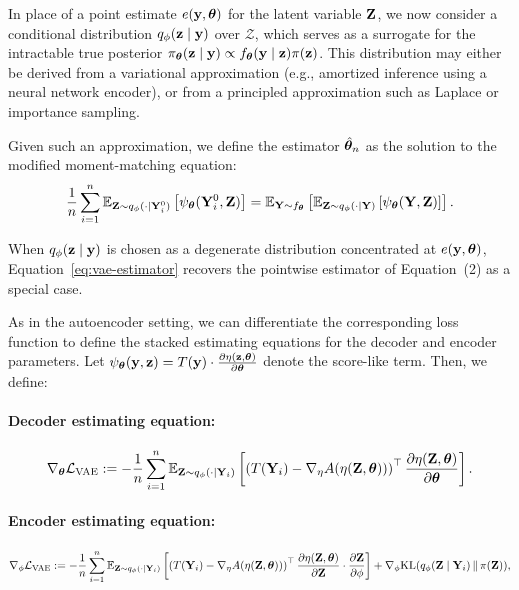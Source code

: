\documentclass[twoside,11pt]{article}
\begin{document}
In place of a point estimate \( e({\bf y}, {\bm{\theta}}) \) for the latent variable \( {\bf Z} \), we now consider a conditional distribution \( q_\phi({\bf z} \mid {\bf y}) \) over \( \mathcal{Z} \), which serves as a surrogate for the intractable true posterior \( \pi_{\bm{\theta}}({\bf z} \mid {\bf y}) \propto f_{\bm{\theta}}({\bf y} \mid {\bf z})\pi({\bf z}) \). This distribution may either be derived from a variational approximation (e.g., amortized inference using a neural network encoder), or from a principled approximation such as Laplace or importance sampling.

Given such an approximation, we define the estimator \( \hat{{\bm{\theta}}}_n \) as the solution to the modified moment-matching equation:
\begin{equation}
\label{eq:vae-estimator}
\frac{1}{n} \sum_{i=1}^n \mathbb{E}_{{\bf Z} \sim q_\phi(\cdot \mid {\bf Y}_i^0)} \left[ \psi_{\bm{\theta}}({\bf Y}_i^0, {\bf Z}) \right]
=
\mathbb{E}_{{\bf Y} \sim f_{\bm{\theta}}}
\left[
\mathbb{E}_{{\bf Z} \sim q_\phi(\cdot \mid {\bf Y})} 
\left[ 
\psi_{\bm{\theta}}({\bf Y}, {\bf Z})
\right]
\right].
\end{equation}

When \( q_\phi({\bf z} \mid {\bf y}) \) is chosen as a degenerate distribution concentrated at \( e({\bf y}, {\bm{\theta}}) \), Equation~\eqref{eq:vae-estimator} recovers the pointwise estimator of Equation~(2) as a special case.

As in the autoencoder setting, we can differentiate the corresponding loss function to define the stacked estimating equations for the decoder and encoder parameters. Let \( \psi_{\bm{\theta}}({\bf y}, {\bf z}) = T({\bf y}) \cdot \frac{\partial \eta({\bf z}, {\bm{\theta}})}{\partial {\bm{\theta}}} \) denote the score-like term. Then, we define:

\paragraph{Decoder estimating equation:}
\begin{align*}
\nabla_{\bm{\theta}} \mathcal{L}_{\text{VAE}} := 
- \frac{1}{n} \sum_{i=1}^n \mathbb{E}_{{\bf Z} \sim q_\phi(\cdot \mid {\bf Y}_i)} 
\left[
\left( T({\bf Y}_i) - \nabla_\eta A(\eta({\bf Z}, {\bm{\theta}})) \right)^\top 
\frac{\partial \eta({\bf Z}, {\bm{\theta}})}{\partial {\bm{\theta}}}
\right].
\end{align*}

\paragraph{Encoder estimating equation:}
\begin{align*}
\nabla_\phi \mathcal{L}_{\text{VAE}} := 
- \frac{1}{n} \sum_{i=1}^n \mathbb{E}_{{\bf Z} \sim q_\phi(\cdot \mid {\bf Y}_i)} 
\left[
\left( T({\bf Y}_i) - \nabla_\eta A(\eta({\bf Z}, {\bm{\theta}})) \right)^\top 
\frac{\partial \eta({\bf Z}, {\bm{\theta}})}{\partial {\bf Z}} \cdot 
\frac{\partial {\bf Z}}{\partial \phi}
\right]
+
\nabla_\phi \text{KL}(q_\phi({\bf Z} \mid {\bf Y}_i) \,\|\, \pi({\bf Z})),
\end{align*}
\end{document}
